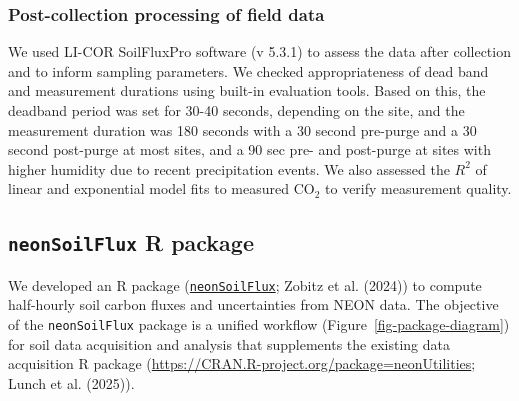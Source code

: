 \documentclass[
  letterpaper,
  DIV=11,
  numbers=noendperiod]{scrartcl}
\begin{document}
\normalsize

\subsubsection{Post-collection processing of field
data}\label{post-collection-processing-of-field-data}

We used LI-COR SoilFluxPro software (v 5.3.1) to assess the data after
collection and to inform sampling parameters. We checked appropriateness
of dead band and measurement durations using built-in evaluation tools.
Based on this, the deadband period was set for 30-40 seconds, depending
on the site, and the measurement duration was 180 seconds with a 30
second pre-purge and a 30 second post-purge at most sites, and a 90 sec
pre- and post-purge at sites with higher humidity due to recent
precipitation events. We also assessed the \(R^{2}\) of linear and
exponential model fits to measured CO\(_{2}\) to verify measurement
quality.

\subsection{\texorpdfstring{\texttt{neonSoilFlux} R
package}{neonSoilFlux R package}}\label{sec-nsf-desc}

We developed an R package
(\href{https://CRAN.R-project.org/package=neonSoilFlux}{\texttt{neonSoilFlux}};
Zobitz et al. (2024)) to compute half-hourly soil carbon fluxes and
uncertainties from NEON data. The objective of the \texttt{neonSoilFlux}
package is a unified workflow (Figure~\ref{fig-package-diagram}) for
soil data acquisition and analysis that supplements the existing data
acquisition R package
(\url{https://CRAN.R-project.org/package=neonUtilities}; Lunch et al.
(2025)).
\end{document}
